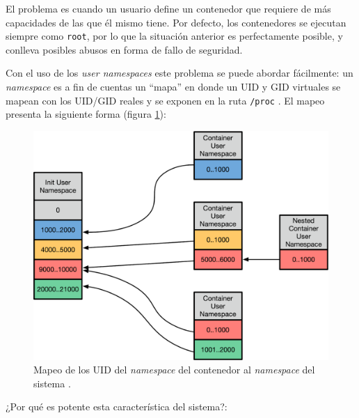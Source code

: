 El problema es cuando un usuario define un contenedor que requiere de más
capacidades de las que él mismo tiene. Por defecto, los contenedores se
ejecutan siempre como \texttt{root}, por lo que la situación anterior es
perfectamente posible, y conlleva posibles abusos en forma
de fallo de seguridad.

Con el uso de los \textit{user namespaces} este problema se puede abordar
fácilmente: un \textit{namespace} es a fin de cuentas un ``mapa'' en donde
un UID y GID virtuales se mapean con los UID/GID reales y se exponen
en la ruta \texttt{/proc} \autocite{blogEvolvingContainerSecurity2021}. El mapeo
presenta la siguiente forma (figura \ref{fig:ns-mapping}):

\begin{figure}[H]
  \centering
  \includegraphics[width=\linewidth]{pictures/ns_mapping.png}
  \caption{Mapeo de los UID del \textit{namespace} del contenedor al \textit{namespace} del sistema \autocite{blogEvolvingContainerSecurity2021}.}
  \label{fig:ns-mapping}
\end{figure}

¿Por qué es potente esta característica del sistema?:

